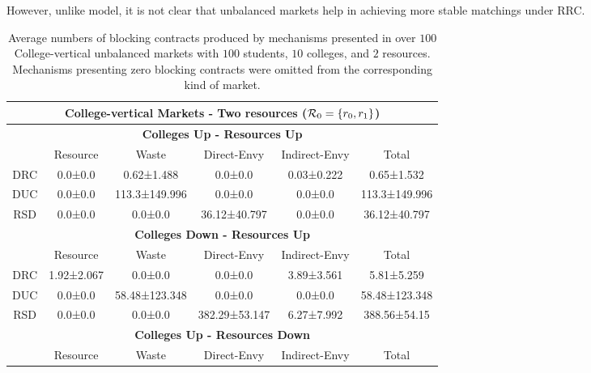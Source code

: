 However, unlike \citet{ashlagi17} model, it is not clear that unbalanced markets help in achieving more stable matchings under RRC.

\begin{table}[ht]
\centering
\small{
\caption{Average numbers of blocking contracts produced by mechanisms presented in  over $100$ College-vertical unbalanced markets with $100$ students, $10$ colleges, and $2$ resources. Mechanisms presenting zero blocking contracts were omitted from the corresponding kind of market.}
\begin{tabular}{cccccc}
\toprule
\multicolumn{6}{c}{\textbf{College-vertical Markets - Two resources ($\operatorname{{\color{black}\mathcal{R}}}_0 = \{r_0,r_1\}$)}}\\
\toprule
\multicolumn{6}{c}{\textbf{Colleges Up - Resources Up}} \\
\hline
& Resource   & Waste   & Direct-Envy   & Indirect-Envy       & Total    \\
\hline
DRC & 0.0±0.0     & 0.62±1.488    & 0.0±0.0       & 0.03±0.222 & 0.65±1.532    \\
DUC & 0.0±0.0     & 113.3±149.996 & 0.0±0.0       & 0.0±0.0    & 113.3±149.996 \\
RSD & 0.0±0.0     & 0.0±0.0       & 36.12±40.797  & 0.0±0.0    & 36.12±40.797  \\
\hline
\multicolumn{6}{c}{\textbf{Colleges Down - Resources Up}} \\
\hline
& Resource   & Waste   & Direct-Envy   & Indirect-Envy       & Total    \\
\hline
DRC & 1.92±2.067  & 0.0±0.0       & 0.0±0.0       & 3.89±3.561 & 5.81±5.259    \\
DUC & 0.0±0.0     & 58.48±123.348 & 0.0±0.0       & 0.0±0.0    & 58.48±123.348 \\
RSD & 0.0±0.0     & 0.0±0.0       & 382.29±53.147 & 6.27±7.992 & 388.56±54.15  \\
\hline
\multicolumn{6}{c}{\textbf{Colleges Up - Resources Down}} \\
\hline
& Resource   & Waste   & Direct-Envy   & Indirect-Envy       & Total    \\

\end{tabular}}
\end{table}
